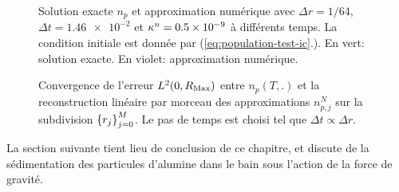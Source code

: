 \begin{figure}[h!]
  \begin{center}
    
    
    
    
    
    
  \end{center}
  \begin{center}
    \caption{Solution exacte $n_p$ et approximation numérique avec
      $\Delta r = 1/64$, $\Delta t = \num{1.46e-2}$ et
      $\kappa^n = \num{0.5e-9}$ à différents temps. La
      condition initiale est donnée par
      (\ref{eq:population-test-ic}.). En vert: solution exacte. En
      violet: approximation numérique.}
    \label{fig:population-timelapse}
  \end{center}
\end{figure}

\begin{figure}[h!]
  \begin{center}
    
    \caption{Convergence de l'erreur $L^2(0, R_\mathrm{Max})$ entre $n_p(T, .)$
      et la reconstruction linéaire par morceau des approximations
      $n_{p,j}^N$ sur la subdivision $\left\{ r_j \right\}_{j = 0}^M$. Le pas
      de temps est choisi tel que $\Delta t \propto \Delta r$.}
    \label{fig:population-convergence}
  \end{center}
\end{figure}

La section suivante tient lieu de conclusion de ce chapitre, et discute
de la sédimentation des particules d'alumine dans le bain sous
l'action de la force de gravité.
